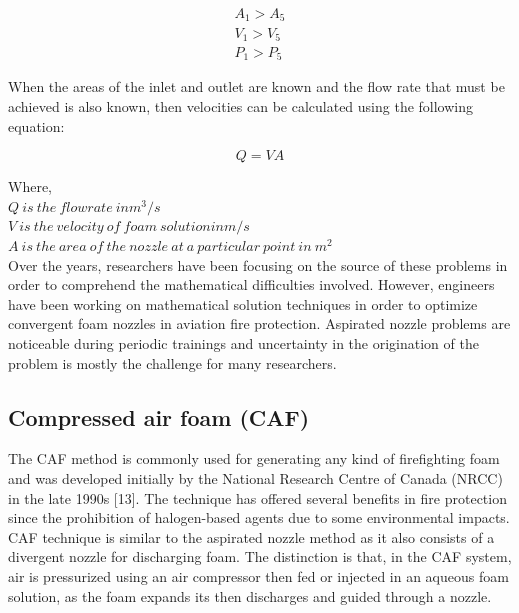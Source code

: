 \documentclass[12pt]{report}
\begin{document}
\begin{gather*}
    A_1 > A_5 \\
    V_1 > V_5 \\
    P_1 > P_5
\end{gather*}

When the areas of the inlet and outlet are known and the flow rate that must be achieved is also known, then velocities can be calculated using the following equation:

\begin{equation}
    Q = VA
\end{equation}

\noindent Where,\\
$Q\ is\ the\ flowrate\ in m^3/s$ \\
$V\ is\ the\ velocity\ of\ foam\ solution in m/s$ \\
$A\ is\ the\ area\ of\ the\ nozzle\ at\ a\ particular\ point\ in\ m^2$ \\

Over the years, researchers have been focusing on the source of these problems in order to comprehend the mathematical difficulties involved. However, engineers have been working on mathematical solution techniques in order to optimize convergent foam nozzles in aviation fire protection. Aspirated nozzle problems are noticeable during periodic trainings and uncertainty in the origination of the problem is mostly the challenge for many researchers.

\subsection{Compressed air foam (CAF)}
The CAF method is commonly used for generating any kind of firefighting foam and was developed initially by the National Research Centre of Canada (NRCC) in the late 1990s [13]. The technique has offered several benefits in fire protection since the prohibition of halogen-based agents due to some environmental impacts.  
CAF technique is similar to the aspirated nozzle method as it also consists of a divergent nozzle for discharging foam. The distinction is that, in the CAF system, air is pressurized using an air compressor then fed or injected in an aqueous foam solution, as the foam expands its then discharges and guided through a nozzle.
\end{document}
